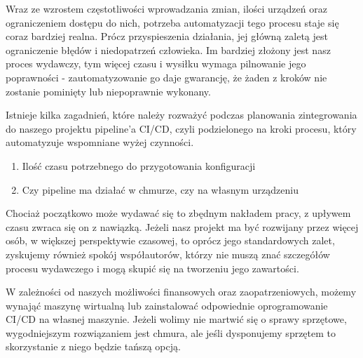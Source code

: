Wraz ze wzrostem częstotliwości wprowadzania zmian, ilości urządzeń oraz ograniczeniem dostępu do nich,
potrzeba automatyzacji tego procesu staje się coraz bardziej realna.
Prócz przyspieszenia działania, jej główną zaletą jest ograniczenie błędów i niedopatrzeń człowieka.
Im bardziej złożony jest nasz proces wydawczy, tym więcej czasu i wysiłku wymaga pilnowanie jego poprawności -
zautomatyzowanie go daje gwarancję, że żaden z kroków nie zostanie pominięty lub niepoprawnie wykonany.

Istnieje kilka zagadnień, które należy rozważyć podczas planowania zintegrowania do naszego projektu pipeline'a CI/CD,
czyli podzielonego na kroki procesu, który automatyzuje wspomniane wyżej czynności.
\begin{enumerate}
    \item Ilość czasu potrzebnego do przygotowania konfiguracji
    \item Czy pipeline ma działać w chmurze, czy na własnym urządzeniu
\end{enumerate}

Chociaż początkowo może wydawać się to zbędnym nakładem pracy, z upływem czasu zwraca się on z nawiązką.
Jeżeli nasz projekt ma być rozwijany przez więcej osób, w większej perspektywie czasowej, to oprócz jego standardowych
zalet, zyskujemy również spokój współautorów, którzy nie muszą znać szczegółów procesu wydawczego i mogą skupić się
na tworzeniu jego zawartości.

W zależności od naszych możliwości finansowych oraz zaopatrzeniowych, możemy wynająć maszynę wirtualną
lub zainstalować odpowiednie oprogramowanie CI/CD na własnej maszynie. 
Jeżeli wolimy nie martwić się o sprawy sprzętowe, wygodniejszym rozwiązaniem jest chmura,
ale jeśli dysponujemy sprzętem to skorzystanie z niego będzie tańszą opcją. %


